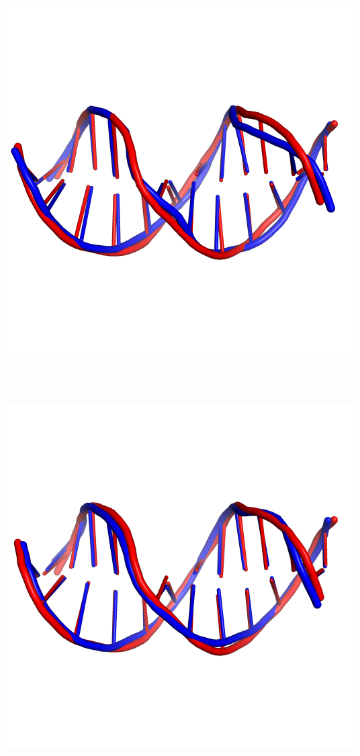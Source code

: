 \begin{figure}[!p]

  \begin{subfigure}{.5\linewidth}
    \includegraphics[width=\linewidth]{figures/discusion/rsroff/424d_best.png}
    \caption{}
  \end{subfigure}%
~
  \begin{subfigure}{.5\linewidth}
    \includegraphics[width=\linewidth]{figures/discusion/rsroff/424d_rmsd.png}
    \caption{}
  \end{subfigure}


\end{figure}
